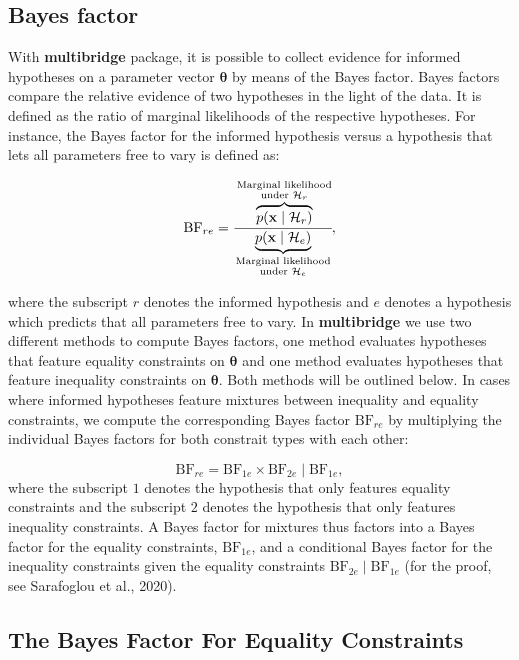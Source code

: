 \documentclass[
  english,
  man,floatsintext]{apa6}
\begin{document}
\hypertarget{bayes-factor}{%
\subsection{Bayes factor}\label{bayes-factor}}

With \textbf{multibridge} package, it is possible to collect evidence for informed hypotheses on a parameter vector \(\boldsymbol{\theta}\) by means of the Bayes factor. Bayes factors compare the relative evidence of two hypotheses in the light of the data. It is defined as the ratio of marginal likelihoods of the respective hypotheses. For instance, the Bayes factor for the informed hypothesis versus a hypothesis that lets all parameters free to vary is defined as:

\begin{align*}
\text{BF}_{re} = \cfrac{\overbrace{p(\mathbf{x}\mid \mathcal{H}_r)}^{\substack{\text{Marginal likelihood}\\\text{under $\mathcal{H}_r$}}}}{\underbrace{p(\mathbf{x}\mid \mathcal{H}_e)}_{\substack{\text{Marginal likelihood}\\\text{under $\mathcal{H}_e$}}}},
\end{align*}

where the subscript \(r\) denotes the informed hypothesis and \(e\) denotes a hypothesis which predicts that all parameters free to vary. In \textbf{multibridge} we use two different methods to compute Bayes factors, one method evaluates hypotheses that feature equality constraints on \(\boldsymbol{\theta}\) and one method evaluates hypotheses that feature inequality constraints on \(\boldsymbol{\theta}\). Both methods will be outlined below. In cases where informed hypotheses feature mixtures between inequality and equality constraints, we compute the corresponding Bayes factor \(\text{BF}_{re}\) by multiplying the individual Bayes factors for both constrait types with each other:

\[
\text{BF}_{re}
= \text{BF}_{1e} \times \text{BF}_{2e} \mid \text{BF}_{1e},
\]
where the subscript \(1\) denotes the hypothesis that only features equality constraints and the subscript \(2\) denotes the hypothesis that only features inequality constraints. A Bayes factor for mixtures thus factors into a Bayes factor for the equality constraints, \(\text{BF}_{1e}\), and a conditional Bayes factor for the inequality constraints given the equality constraints \(\text{BF}_{2e} \mid \text{BF}_{1e}\) (for the proof, see Sarafoglou et al., 2020).

\hypertarget{the-bayes-factor-for-equality-constraints}{%
\subsection{The Bayes Factor For Equality Constraints}\label{the-bayes-factor-for-equality-constraints}}
\end{document}

